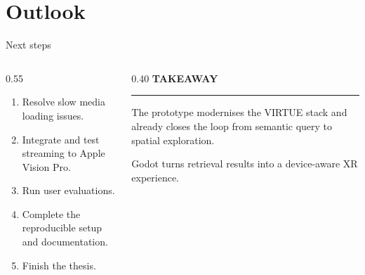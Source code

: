 \section{Outlook}
\begin{frame}[c]{Next steps}
\begin{columns}[T,onlytextwidth]
  \begin{column}{0.55\textwidth}
    \small
    \begin{enumerate}
      \item Resolve slow media loading issues.
      \item Integrate and test streaming to Apple Vision Pro.
      \item Run user evaluations.
      \item Complete the reproducible setup and documentation.
      \item Finish the thesis.
    \end{enumerate}
  \end{column}
  \begin{column}{0.40\textwidth}
    \textcolor{unired}{\large\textbf{TAKEAWAY}}

    \vspace{0.12cm}
    \color{unimint}\rule{\linewidth}{1.6pt}

    \vspace{0.22cm}
    \small
    The prototype modernises the VIRTUE stack and already closes the loop from semantic query to spatial exploration.

    \vspace{0.35cm}
    Godot turns retrieval results into a device-aware XR experience.
  \end{column}
\end{columns}

\end{frame}
